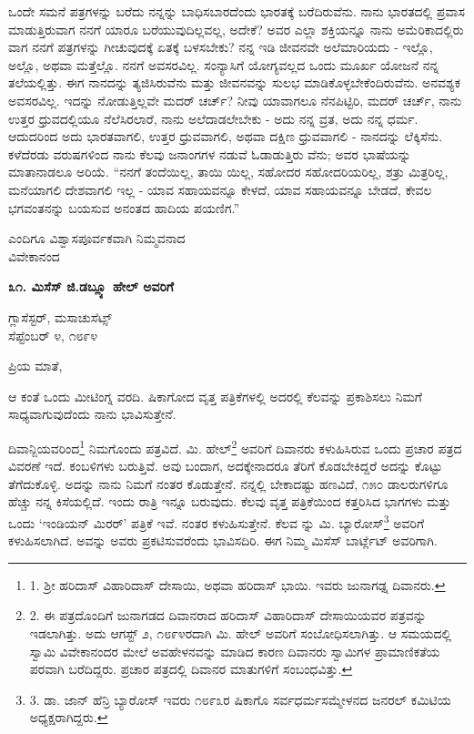 ಒಂದೇ ಸಮನೆ ಪತ್ರಗಳನ್ನು ಬರೆದು ನನ್ನನ್ನು ಬಾಧಿಸಬಾರದೆಂದು ಭಾರತಕ್ಕೆ ಬರೆದಿರುವೆನು. ನಾನು ಭಾರತದಲ್ಲಿ ಪ್ರವಾಸ ಮಾಡುತ್ತಿರುವಾಗ ನನಗೆ ಯಾರೂ ಬರೆಯುವುದಿಲ್ಲವಲ್ಲ, ಅದೇಕೆ? ಅವರ ಎಲ್ಲಾ ಶಕ್ತಿಯನ್ನೂ ನಾನು ಅಮೆರಿಕಾದಲ್ಲಿರು ವಾಗ ನನಗೆ ಪತ್ರಗಳನ್ನು ಗೀಚುವುದಕ್ಕೆ ಏತಕ್ಕೆ ಬಳಸಬೇಕು? ನನ್ನ ಇಡಿ ಜೀವನವೇ ಅಲೆಮಾರಿಯದು - ಇಲ್ಲೊ, ಅಲ್ಲೊ, ಅಥವಾ ಮತ್ತೆಲ್ಲೊ. ನನಗೆ ಅವಸರವಿಲ್ಲ. ಸಂನ್ಯಾಸಿಗೆ ಯೋಗ್ಯವಲ್ಲದ ಒಂದು ಮೂರ್ಖ ಯೋಜನೆ ನನ್ನ ತಲೆಯಲ್ಲಿತ್ತು. ಈಗ ನಾನದನ್ನು ತ್ಯಜಿಸಿರುವೆನು ಮತ್ತು ಜೀವನವನ್ನು ಸುಲಭ ಮಾಡಿಕೊಳ್ಳಬೇಕೆಂದಿರುವೆನು. ಅನವಶ್ಯಕ ಅವಸರವಿಲ್ಲ. ಇದನ್ನು ನೋಡುತ್ತಿಲ್ಲವೇ ಮದರ್ ಚರ್ಚ್? ನೀವು ಯಾವಾಗಲೂ ನೆನಪಿಟ್ಟಿರಿ, ಮದರ್ ಚರ್ಚ್, ನಾನು ಉತ್ತರ ಧ್ರುವದಲ್ಲಿಯೂ ನೆಲೆಸಿರಲಾರೆ, ನಾನು ಅಲೆದಾಡಲೇಬೇಕು - ಅದು ನನ್ನ ವ್ರತ, ಅದು ನನ್ನ ಧರ್ಮ. ಆದುದರಿಂದ ಅದು ಭಾರತವಾಗಲಿ, ಉತ್ತರ ಧ್ರುವವಾಗಲಿ, ಅಥವಾ ದಕ್ಷಿಣ ಧ್ರುವವಾಗಲಿ - ನಾನದನ್ನು ಲೆಕ್ಕಿಸೆನು. ಕಳೆದೆರಡು ವರುಷಗಳಿಂದ ನಾನು ಕೆಲವು ಜನಾಂಗಗಳ ನಡುವೆ ಓಡಾಡುತ್ತಿರು ವೆನು; ಅವರ ಭಾಷೆಯನ್ನು ಮಾತಾನಾಡಲೂ ಅರಿಯೆ. “ನನಗೆ ತಂದೆಯಿಲ್ಲ, ತಾಯಿ ಯಿಲ್ಲ, ಸಹೋದರ ಸಹೋದರಿಯರಿಲ್ಲ, ಶತ್ರು ಮಿತ್ರರಿಲ್ಲ, ಮನೆಯಾಗಲಿ ದೇಶವಾಗಲಿ ಇಲ್ಲ - ಯಾವ ಸಹಾಯವನ್ನೂ ಕೇಳದೆ, ಯಾವ ಸಹಾಯವನ್ನೂ ಬೇಡದೆ, ಕೇವಲ ಭಗವಂತನನ್ನು ಬಯಸುವ ಅನಂತದ ಹಾದಿಯ ಪಯಣಿಗ.”

\begin{flushright}
ಎಂದಿಗೂ ವಿಶ್ವಾಸಪೂರ್ವಕವಾಗಿ ನಿಮ್ಮವನಾದ\\ವಿವೇಕಾನಂದ
\end{flushright}

\begin{center}
\textbf{೩೧. ಮಿಸೆಸ್ ಜಿ.ಡಬ್ಲ್ಯೂ ಹೇಲ್ ಅವರಿಗೆ}
\end{center}

\begin{flushright}
ಗ್ಲಾಸೆಸ್ಟರ್, ಮಸಾಚುಸೆಟ್ಸ್\\ಸೆಪ್ಟೆಂಬರ್ ೪, ೧೮೯೪
\end{flushright}

ಪ್ರಿಯ ಮಾತೆ,

ಆ ಕಂತೆ ಒಂದು ಮೀಟಿಂಗ್ನ ವರದಿ. ಷಿಕಾಗೋದ ವೃತ್ತ ಪತ್ರಿಕೆಗಳಲ್ಲಿ ಅದರಲ್ಲಿ ಕೆಲವನ್ನು ಪ್ರಕಾಶಿಸಲು ನಿಮಗೆ ಸಾಧ್ಯವಾಗುವುದೆಂದು ನಾನು ಭಾವಿಸುತ್ತೇನೆ.

ದಿವಾನ್ಜಿಯವರಿಂದ\footnote{1. ಶ‍್ರೀ ಹರಿದಾಸ್ ವಿಹಾರಿದಾಸ್ ದೇಸಾಯಿ, ಅಥವಾ ಹರಿದಾಸ್ ಭಾಯಿ. ಇವರು ಜುನಾಗಢ್ನ ದಿವಾನರು.} ನಿಮಗೊಂದು ಪತ್ರವಿದೆ. ಮಿ. ಹೇಲ್\footnote{2. ಈ ಪತ್ರದೊಂದಿಗೆ ಜುನಾಗಡದ ದಿವಾನರಾದ ಹರಿದಾಸ್ ವಿಹಾರಿದಾಸ್ ದೇಸಾಯಿಯವರ ಪತ್ರವನ್ನು ಇಡಲಾಗಿತ್ತು. ಅದು ಆಗಸ್ಟ್ ೨, ೧೮೯೪ರದಾಗಿ ಮಿ. ಹೇಲ್ ಅವರಿಗೆ ಸಂಬೋಧಿಸಲಾಗಿತ್ತು. ಆ ಸಮಯದಲ್ಲಿ ಸ್ವಾಮಿ ವಿವೇಕಾನಂದರ ಮೇಲೆ ಅವಹೇಳನವನ್ನು ಮಾಡಿದ ಕಾರಣ ದಿವಾನರು ಸ್ವಾಮಿಗಳ ಪ್ರಾಮಾಣಿಕತೆಯ ಪರವಾಗಿ ಬರೆದಿದ್ದರು. ಪ್ರಚಾರ ಪತ್ರದಲ್ಲಿ ದಿವಾನರ ಮಾತುಗಳಿಗೆ ಸಂಬಂಧವಿತ್ತು.} ಅವರಿಗೆ ದಿವಾನರು ಕಳುಹಿಸಿರುವ ಒಂದು ಪ್ರಚಾರ ಪತ್ರದ ವಿವರಣೆ ಇದೆ. ಕಂಬಳಿಗಳು ಬರುತ್ತಿವೆ. ಅವು ಬಂದಾಗ, ಅದಕ್ಕೇನಾದರೂ ತೆರಿಗೆ ಕೊಡಬೇಕಿದ್ದರೆ ಅದನ್ನು ಕೊಟ್ಟು ತೆಗೆದುಕೊಳ್ಳಿ. ಅದನ್ನು ನಾನು ನಿಮಗೆ ನಂತರ ಕೊಡುತ್ತೇನೆ. ನನ್ನಲ್ಲಿ ಬೇಕಾದಷ್ಟು ಹಣವಿದೆ, ೧೫೦ ಡಾಲರುಗಳಿಗೂ ಹೆಚ್ಚು ನನ್ನ ಕಿಸೆಯಲ್ಲಿದೆ. ಇಂದು ರಾತ್ರಿ ಇನ್ನೂ ಬರುವುದು. ಕೆಲವು ವೃತ್ತ ಪತ್ರಿಕೆಯಿಂದ ಕತ್ತರಿಸಿದ ಭಾಗಗಳು ಮತ್ತು ಒಂದು ‘ಇಂಡಿಯನ್ ಮಿರರ್’ ಪತ್ರಿಕೆ ಇವೆ. ನಂತರ ಕಳುಹಿಸುತ್ತೇನೆ. ಕೆಲವ ನ್ನು ಮಿ. ಬ್ಯಾರೋಸ್\footnote{3. ಡಾ. ಜಾನ್ ಹೆನ್ರಿ ಬ್ಯಾರೋಸ್ ಇವರು ೧೮೯೩ರ ಷಿಕಾಗೊ ಸರ್ವಧರ್ಮಸಮ್ಮೇಳನದ ಜನರಲ್ ಕಮಿಟಿಯ ಅಧ್ಯಕ್ಷರಾಗಿದ್ದರು.} ಅವರಿಗೆ ಕಳುಹಿಸಲಾಗಿದೆ. ಅವನ್ನು ಅವರು ಪ್ರಕಟಿಸುವರೆಂದು ಭಾವಿಸದಿರಿ. ಈಗ ನಿಮ್ಮ ಮಿಸೆಸ್ ಬಾರ್ಟ್ಲೆಟ್ ಅವರಿಗಾಗಿ.

